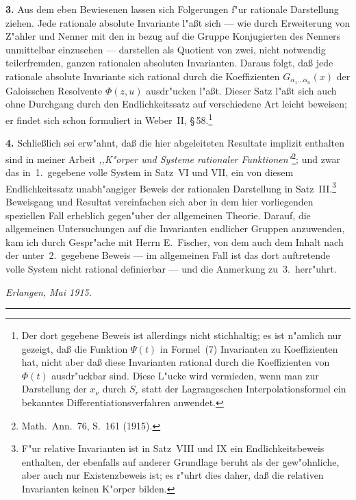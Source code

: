 \documentclass[11pt,a4paper]{article}
\begin{document}
\smallskip
\noindent
\textbf{3.} Aus dem eben Bewiesenen lassen sich Folgerungen f"{u}r rationale
Darstellung ziehen. Jede rationale absolute Invariante l"{a}\ss{}t sich --- wie
durch Erweiterung von Z"{a}hler und Nenner mit den in bezug auf die
Gruppe Konjugierten des Nenners unmittelbar einzusehen --- darstellen
als Quotient von zwei, nicht notwendig teilerfremden, ganzen rationalen
absoluten Invarianten. Daraus folgt, da\ss{} jede rationale absolute Invariante
sich rational durch die Koeffizienten $G_{\alpha_{1}\dots\alpha_{n}}(x)$ der Galoisschen
Resolvente $\Phi(z,u)$ ausdr"{u}cken l"{a}\ss{}t. Dieser Satz l"{a}\ss{}t sich auch ohne
Durchgang durch den Endlichkeitssatz auf verschiedene Art leicht beweisen;
er findet sich schon formuliert in Weber~II, \S\,58.\footnote{Der dort gegebene
Beweis ist allerdings nicht stichhaltig; es ist n"{a}mlich nur gezeigt, da\ss{}
die Funktion $\Psi(t)$ in Formel~(7) Invarianten zu Koeffizienten hat, nicht
aber da\ss{} diese Invarianten rational durch die Koeffizienten von $\Phi(t)$
ausdr"{u}ckbar sind. Diese L"{u}cke wird vermieden, wenn man zur Darstellung
der $x_{\nu}$ durch $S_{r}$ statt der Lagrangeschen Interpolationsformel ein bekanntes
Differentiationsverfahren anwendet.}

\smallskip
\noindent
\textbf{4.} Schlie\ss{}lich sei erw"{a}hnt, da\ss{} die hier abgeleiteten Resultate implizit
enthalten sind in meiner Arbeit \emph{,,K"{o}rper und Systeme rationaler Funktionen"{}}\footnote{Math.\ Ann.\ 76, S.\ 161 (1915).}; und zwar das in~1.\ gegebene volle System
in Satz~VI und VII, ein von diesem Endlichkeitssatz unabh"{a}ngiger Beweis
der rationalen Darstellung in Satz~III.\footnote{F"{u}r relative Invarianten ist
in Satz~VIII und IX ein Endlichkeitsbeweis enthalten, der ebenfalls auf
anderer Grundlage beruht als der gew"{o}hnliche, aber auch nur Existenzbeweis
ist; es r"{u}hrt dies daher, da\ss{} die relativen Invarianten keinen K"{o}rper bilden.}
Beweisgang und Resultat vereinfachen sich aber in dem hier vorliegenden
speziellen Fall erheblich gegen"{u}ber der allgemeinen Theorie. Darauf, die
allgemeinen Untersuchungen auf die Invarianten endlicher Gruppen
anzuwenden, kam ich durch Gespr"{a}che mit Herrn E.~Fischer, von dem
auch dem Inhalt nach der unter~2.\ gegebene Beweis --- im allgemeinen
Fall ist das dort auftretende volle System nicht rational definierbar ---
und die Anmerkung zu~3.\ herr"{u}hrt.

\smallskip
\noindent
\textit{Erlangen, Mai 1915.}

\bigskip
\hrule
\bigskip
\end{document}
